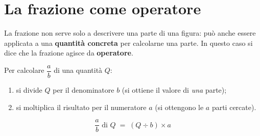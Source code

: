 \section{La frazione come operatore}

La frazione non serve solo a descrivere una parte di una figura:
può anche essere applicata a una \textbf{quantità concreta} per calcolarne una parte.
In questo caso si dice che la frazione agisce da \textbf{operatore}.

\begin{regola}
    Per calcolare $\dfrac{a}{b}$ di una quantità $Q$:
    \begin{enumerate}[leftmargin=1.5em, itemsep=2pt]
        \item si divide $Q$ per il denominatore $b$ (si ottiene il valore di \emph{una} parte);
        \item si moltiplica il risultato per il numeratore $a$ (si ottengono le $a$ parti cercate).
    \end{enumerate}
    \[
        \frac{a}{b} \text{ di } Q \;=\; (Q \div b) \times a
    \]
\end{regola}

